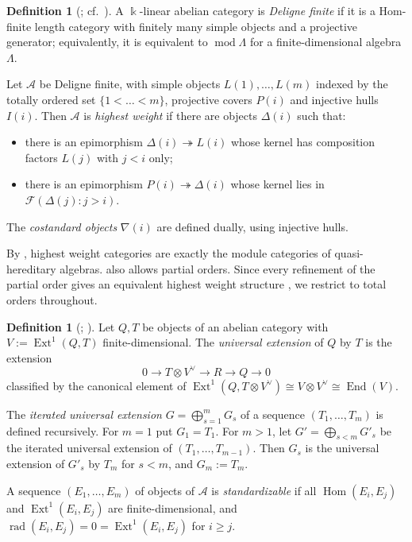 \documentclass[11pt,reqno]{amsart}
\theoremstyle{plain}
\theoremstyle{definition}
\newtheorem{definition}[theorem]{Definition}
\theoremstyle{remark}
\newcommand{\kk}{\Bbbk}
\DeclareMathOperator{\Hom}{Hom}
\DeclareMathOperator{\End}{End}
\DeclareMathOperator{\Ext}{Ext}
\DeclareMathOperator{\rad}{rad}
\newcommand{\modd}{\operatorname{mod}}
\newcommand{\cA}{\mathcal{A}}
\newcommand{\cF}{\mathcal{F}}
\begin{document}
\begin{definition}[{\cite{CPS88}; cf.\ \cite[\S2.1]{BB26}}]\label{def:hw}
A $\kk$-linear abelian category is \emph{Deligne finite} if it is a Hom-finite length category with finitely many simple objects and a projective generator; equivalently, it is equivalent to $\modd\Lambda$ for a finite-dimensional algebra $\Lambda$.

Let $\cA$ be Deligne finite, with simple objects $L(1),\dots,L(m)$ indexed by the totally ordered set $\{1<\dots<m\}$, projective covers $P(i)$ and injective hulls $I(i)$. Then $\cA$ is \emph{highest weight} if there are objects $\Delta(i)$ such that:
\begin{itemize}
\item[(st1)] there is an epimorphism $\Delta(i)\twoheadrightarrow L(i)$ whose kernel has composition factors $L(j)$ with $j<i$ only;
\item[(st2)] there is an epimorphism $P(i)\twoheadrightarrow\Delta(i)$ whose kernel lies in $\cF(\Delta(j):j>i)$.
\end{itemize}
The \emph{costandard objects} $\nabla(i)$ are defined dually, using injective hulls.
\end{definition}

By \cite{CPS88}, highest weight categories are exactly the module categories of quasi-hereditary algebras. \cite{BB26} also allows partial orders. Since every refinement of the partial order gives an equivalent highest weight structure \cite[Rem.~2.3]{BB26}, we restrict to total orders throughout.

\begin{definition}[{\cite{DR92}; \cite[\S2.2]{BB26}}]\label{def:univ-ext}
Let $Q,T$ be objects of an abelian category with $V:=\Ext^1(Q,T)$ finite-dimensional. The \emph{universal extension} of $Q$ by $T$ is the extension
\[0\to T\otimes V^\vee\to R\to Q\to0\]
classified by the canonical element of $\Ext^1(Q,T\otimes V^\vee)\cong V\otimes V^\vee\cong\End(V)$.

The \emph{iterated universal extension} $G=\bigoplus_{s=1}^mG_s$ of a sequence $(T_1,\dots,T_m)$ is defined recursively. For $m=1$ put $G_1=T_1$. For $m>1$, let $G'=\bigoplus_{s<m}G'_s$ be the iterated universal extension of $(T_1,\dots,T_{m-1})$. Then $G_s$ is the universal extension of $G'_s$ by $T_m$ for $s<m$, and $G_m:=T_m$.

A sequence $(E_1,\dots,E_m)$ of objects of $\cA$ is \emph{standardizable} if all $\Hom(E_i,E_j)$ and $\Ext^1(E_i,E_j)$ are finite-dimensional, and $\rad(E_i,E_j)=0=\Ext^1(E_i,E_j)$ for $i\ge j$.
\end{definition}
\end{document}
